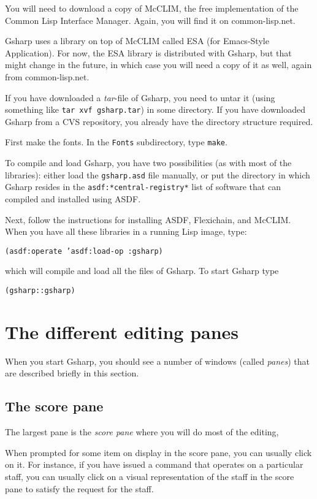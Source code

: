 \documentclass[11pt]{book}
\def\gs{Gsharp}
\def\lisp{Lisp}
\begin{document}
You will need to download a copy of McCLIM, the free implementation of
the Common Lisp Interface Manager.  Again, you will find it on
common-lisp.net.

{\gs} uses a library on top of McCLIM called ESA (for Emacs-Style
Application).  For now, the ESA library is distributed with {\gs}, but
that might change in the future, in which case you will need a copy of
it as well, again from common-lisp.net.

If you have downloaded a \emph{tar}-file of {\gs}, you need to untar
it (using something like \texttt{tar xvf gsharp.tar}) in some
directory.  If you have downloaded {\gs} from a CVS repository, you
already have the directory structure required.

First make the fonts.  In the \texttt{Fonts} subdirectory, type
\texttt{make}. 

To compile and load {\gs}, you have two possibilities (as with most of
the libraries): either load the \texttt{gsharp.asd} file manually, or
put the directory in which {\gs} resides in the
\texttt{asdf:*central-registry*} list of software that can compiled
and installed using ASDF.

Next, follow the instructions for installing ASDF, Flexichain, and
McCLIM.  When you have all these libraries in a running {\lisp} image,
type: 

\texttt{(asdf:operate 'asdf:load-op :gsharp)}

which will compile and load all the files of {\gs}. To start {\gs} type 

\texttt{(gsharp::gsharp)}

\section{The different editing panes}

When you start {\gs}, you should see a number of windows (called
\emph{panes}) that are described briefly in this section.

\subsection{The score pane}
\label{sec-score-pane}

The largest pane is the \emph{score pane} where you will do most of the editing,

When prompted for some item on display in the score pane, you can
usually click on it.  For instance, if you have issued a command that
operates on a particular staff, you can usually click on a visual
representation of the staff in the score pane to satisfy the request
for the staff. 
\end{document}
